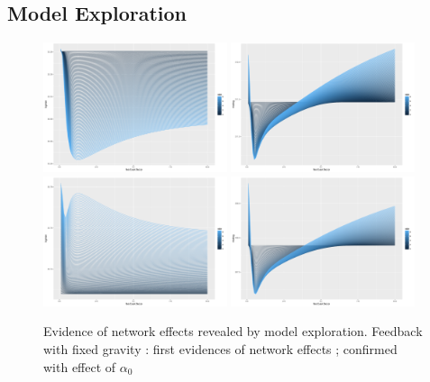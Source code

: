 \documentclass[Royal,sageh,times]{sagej}
\begin{document}
\subsection*{Model Exploration}




\begin{figure}
\centering
\includegraphics[width=0.48\textwidth]{figures/logmse-feedbackDecay_ZOOM}
\includegraphics[width=0.48\textwidth]{figures/mselog-feedbackDecay_ZOOM}\\
\includegraphics[width=0.48\textwidth]{figures/logmse-feedbackDecay_ZOOM_fixedgravity}
\includegraphics[width=0.48\textwidth]{figures/mselog-feedbackDecay_ZOOM_fixedgravity}
\caption{Evidence of network effects revealed by model exploration. Feedback with fixed gravity : first evidences of network effects ; confirmed with effect of $\alpha_0$}
\end{figure}
\end{document}
